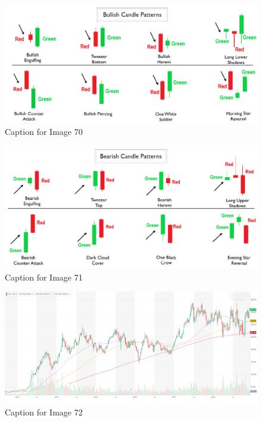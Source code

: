 \documentclass{article}
\begin{document}
\vspace{10pt}

\begin{figure}[!htb]
    \centering
    \includegraphics[width=\textwidth]{imgs/70.png}
    \caption{Caption for Image 70}
\end{figure}

\vspace{10pt}

\begin{figure}[!htb]
    \centering
    \includegraphics[width=\textwidth]{imgs/71.png}
    \caption{Caption for Image 71}
\end{figure}

\vspace{10pt}

\begin{figure}[!htb]
    \centering
    \includegraphics[width=\textwidth]{imgs/72.png}
    \caption{Caption for Image 72}
\end{figure}
\end{document}
